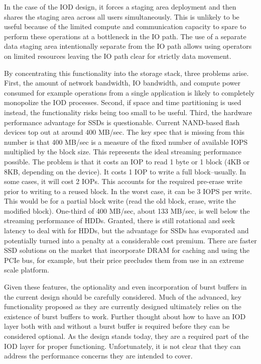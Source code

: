 \documentclass[conference]{sig-alt-gov2}
\begin{document}
In the case of the IOD design, it forces a staging area deployment and then
shares the staging area across all users simultaneously. This is unlikely to be
useful because of the limited compute and communication capacity to spare to
perform these operations at a bottleneck in the IO path. The use of a separate
data staging area intentionally separate from the IO path allows using
operators on limited resources leaving the IO path clear for strictly data
movement.

By concentrating this functionality into the storage stack, three problems
arise.  First, the amount of network bandwidth, IO bandwidth, and compute power
consumed for example operations from a single application is likely to
completely monopolize the IOD processes. Second, if space and time partitioning
is used instead, the functionality risks being too small to be useful. Third,
the hardware performance advantage for SSDs is questionable. Current NAND-based
flash devices top out at around 400 MB/sec. The key spec that is missing from
this number is that 400 MB/sec is a measure of the fixed number of available
IOPS multiplied by the block size. This represents the ideal streaming
performance possible. The problem is that it costs an IOP to read 1 byte or 1
block (4KB or 8KB, depending on the device). It costs 1 IOP to write a full
block--usually. In some cases, it will cost 2 IOPs.  This accounts for the
required pre-erase write prior to writing to a reused block. In the worst case,
it can be 3 IOPS per write. This would be for a partial block write (read the
old block, erase, write the modified block). One-third of 400 MB/sec, about 133
MB/sec, is well below the streaming performance of HDDs.  Granted, there is
still rotational and seek latency to deal with for HDDs, but the advantage for
SSDs has evaporated and potentially turned into a penalty at a considerable
cost premium.  There are faster SSD solutions on the market that incorporate
DRAM for caching and using the PCIe bus, for example, but their price precludes
them from use in an extreme scale platform.

Given these features, the optionality and even incorporation of burst buffers
in the current design should be carefully considered. Much of the advanced, key
functionality proposed as they are currently designed ultimately relies on the
existence of burst buffers to work. Further thought about how to have an IOD
layer both with and without a burst buffer is required before they can be
considered optional. As the design stands today, they are a required part of
the IOD layer for proper functioning. Unfortunately, it is not clear that they
can address the performance concerns they are intended to cover.
\end{document}
